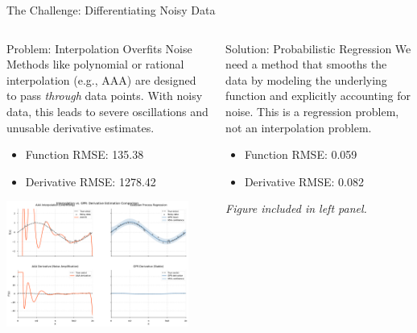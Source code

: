 \documentclass[aspectratio=169]{beamer}
\begin{document}
\begin{frame}{The Challenge: Differentiating Noisy Data}
  \begin{columns}[t]
    \begin{column}{0.48\textwidth}
      \begin{block}{Problem: Interpolation Overfits Noise}
        \tiny
        Methods like polynomial or rational interpolation (e.g., AAA) are designed to pass \textit{through} data points. With noisy data, this leads to severe oscillations and unusable derivative estimates.
        \begin{itemize}
            \item Function RMSE: 135.38
            \item Derivative RMSE: 1278.42
        \end{itemize}
      \end{block}
      \begin{center}
        \includegraphics[width=0.9\textwidth]{gpr_vs_aaa_comparison.pdf}
      \end{center}
    \end{column}
    \begin{column}{0.48\textwidth}
      \begin{block}{Solution: Probabilistic Regression}
          \tiny
          We need a method that smooths the data by modeling the underlying function and explicitly accounting for noise. This is a regression problem, not an interpolation problem.
          \begin{itemize}
            \item Function RMSE: 0.059
            \item Derivative RMSE: 0.082
        \end{itemize}
      \end{block}
      \begin{center}
        \textit{Figure included in left panel.}
      \end{center}
    \end{column}
  \end{columns}
\end{frame}
\end{document}

